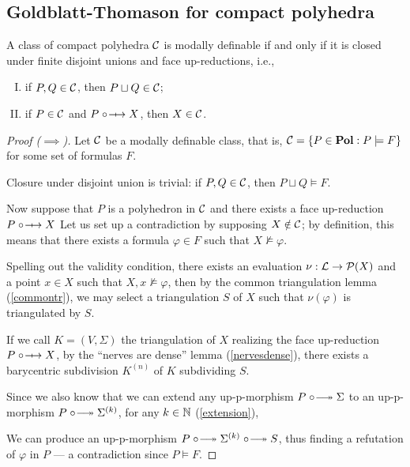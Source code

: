 \subsection{Goldblatt-Thomason for compact polyhedra}
\begin{theorem}[GTKP]
    A class of compact polyhedra $\operatorname{\mathcal{C}}$ is modally definable if and only if it is closed under finite disjoint unions and face up-reductions, i.e.,
    \begin{enumerate}[(I)]
        \item if $P,Q\in \operatorname{\mathcal{C}}$, then $P\sqcup Q\in \operatorname{\mathcal{C}}$;
        \item if $P\in \operatorname{\mathcal{C}}$ and $P\fupred X$, then $X\in \operatorname{\mathcal{C}}$.
    \end{enumerate}
\end{theorem}
\begin{proof}[Proof ($\implies$)]
    Let $\operatorname{\mathcal{C}}$ be a modally definable class, that is, $\operatorname{\mathcal{C}}=\left\{ P\in \operatorname{\textbf{Pol}}:P\models F \right\}$ for some set of formulas $F$.

    Closure under disjoint union is trivial: if $P,Q\in \operatorname{\mathcal{C}}$, then $P\sqcup Q\models F$.

    Now suppose that $P$ is a polyhedron in $\operatorname{\mathcal{C}}$ and there exists a face up-reduction $P\fupred X$ 
    Let us set up a contradiction by supposing $X\notin \operatorname{\mathcal{C}}$; by definition, this means that there exists a formula $\varphi\in F$ such that $X\not\models\varphi$.

    Spelling out the validity condition, there exists an evaluation $\nu:\operatorname{\mathcal{L}}\to \operatorname{\mathcal{P}}(X)$ and a point $x\in X$ such that $X,x\not\models\varphi$, then by the common triangulation lemma (\ref{commontr}), 
    we may select a triangulation $S$ of $X$ such that $\nu(\varphi)$ is triangulated by $S$.

    If we call $K=(V,\Sigma)$ the triangulation of $X$ realizing the face up-reduction $P\fupred X$, by the ``nerves are dense'' lemma (\ref{nervesdense}), 
    there exists a barycentric subdivision $K^{(n)}$ of $K$ subdividing $S$.

    Since we also know that we can extend any up-p-morphism $P\upred \Sigma$ to an up-p-morphism $P\upred \Sigma^{(k)}$, for any $k\in \operatorname{\mathbb{N}}$ (\ref{extension}), 

    We can produce an up-p-morphism $P\upred \Sigma^{(k)}\upred S$, thus finding a refutation of $\varphi$  in $P$ --- a contradiction since $P\models F$.
\end{proof}
